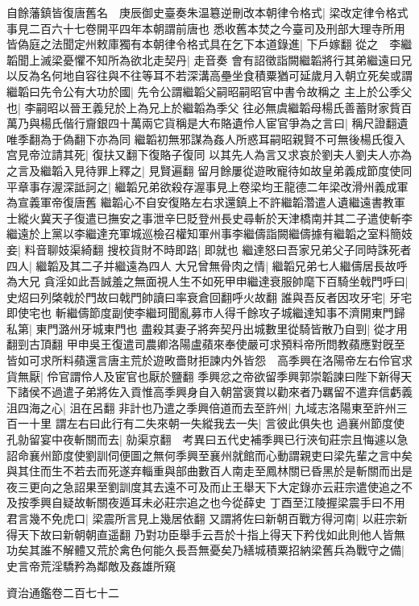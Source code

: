 自餘藩鎮皆復唐舊名　庚辰御史臺奏朱温簒逆刪改本朝律令格式|{
	梁改定律令格式事見二百六十七卷開平四年本朝謂前唐也}
悉收舊本焚之今臺司及刑部大理寺所用皆偽庭之法聞定州敕庫獨有本朝律令格式具在乞下本道錄進|{
	下戶嫁翻}
從之　李繼韜聞上滅梁憂懼不知所為欲北走契丹|{
	走音奏}
會有詔徵詣闕繼韜將行其弟繼遠曰兄以反為名何地自容往與不往等耳不若深溝高壘坐食積粟猶可延歲月入朝立死矣或謂繼韜曰先令公有大功於國|{
	先令公謂繼韜父嗣昭嗣昭官中書令故稱之}
主上於公季父也|{
	李嗣昭以晉王義兒於上為兄上於繼韜為季父}
往必無虞繼韜母楊氏善蓄財家貲百萬乃與楊氏偕行齎銀四十萬兩它貨稱是大布賂遺伶人宦官爭為之言曰|{
	稱尺證翻遺唯季翻為于偽翻下亦為同}
繼韜初無邪謀為姦人所惑耳嗣昭親賢不可無後楊氏復入宫見帝泣請其死|{
	復扶又翻下復賂子復同}
以其先人為言又求哀於劉夫人劉夫人亦為之言及繼韜入見待罪上釋之|{
	見賢遍翻}
留月餘屢從遊畋寵待如故皇弟義成節度使同平章事存渥深詆訶之|{
	繼韜兄弟欲殺存渥事見上卷梁均王龍德二年梁改滑州義成軍為宣義軍帝復唐舊}
繼韜心不自安復賂左右求還鎮上不許繼韜濳遣人遺繼遠書教軍士縱火冀天子復遣已撫安之事泄辛巳貶登州長史尋斬於天津橋南并其二子遣使斬李繼遠於上黨以李繼達充軍城巡檢召權知軍州事李繼儔詣闕繼儔據有繼韜之室料簡妓妾|{
	料音聊妓渠綺翻}
搜校貨財不時即路|{
	即就也}
繼達怒曰吾家兄弟父子同時誅死者四人|{
	繼韜及其二子并繼遠為四人}
大兄曾無骨肉之情|{
	繼韜兄弟七人繼儔居長故呼為大兄}
貪淫如此吾誠羞之無面視人生不如死甲申繼達衰服帥麾下百騎坐戟門呼曰|{
	史炤曰列棨戟於門故曰戟門帥讀曰率衰倉回翻呼火故翻}
誰與吾反者因攻牙宅|{
	牙宅即使宅也}
斬繼儔節度副使李繼珂聞亂募市人得千餘攻子城繼達知事不濟開東門歸私第|{
	東門潞州牙城東門也}
盡殺其妻子將奔契丹出城數里從騎皆散乃自剄|{
	從才用翻剄古頂翻}
甲申吳王復遣司農卿洛陽盧蘋來奉使嚴可求預料帝所問教蘋應對旣至皆如可求所料蘋還言唐主荒於遊畋嗇財拒諫内外皆怨　高季興在洛陽帝左右伶官求貨無厭|{
	伶官謂伶人及宦官也厭於鹽翻}
季興忿之帝欲留季興郭崇韜諫曰陛下新得天下諸侯不過遣子弟將佐入貢惟高季興身自入朝當褒賞以勸來者乃羈留不遣弃信虧義沮四海之心|{
	沮在呂翻}
非計也乃遣之季興倍道而去至許州|{
	九域志洛陽東至許州三百一十里}
謂左右曰此行有二失來朝一失縱我去一失|{
	言彼此俱失也}
過襄州節度使孔勍留宴中夜斬關而去|{
	勍渠京翻　考異曰五代史補季興已行浹旬莊宗且悔遽以急詔命襄州節度使劉訓伺便圖之無何季興至襄州就館而心動謂親吏曰梁先輩之言中矣與其住而生不若去而死遂弃輜重與部曲數百人南走至鳳林關已昏黑於是斬關而出是夜三更向之急詔果至劉訓度其去遠不可及而止王舉天下大定錄亦云莊宗遣使追之不及按季興自疑故斬關夜遁耳未必莊宗追之也今從薛史}
丁酉至江陵握梁震手曰不用君言幾不免虎口|{
	梁震所言見上幾居依翻}
又謂將佐曰新朝百戰方得河南|{
	以莊宗新得天下故曰新朝朝直遥翻}
乃對功臣舉手云吾於十指上得天下矜伐如此則他人皆無功矣其誰不解體又荒於禽色何能久長吾無憂矣乃繕城積粟招納梁舊兵為戰守之備|{
	史言帝荒淫驕矜為鄰敵及姦雄所窺}


資治通鑑卷二百七十二
